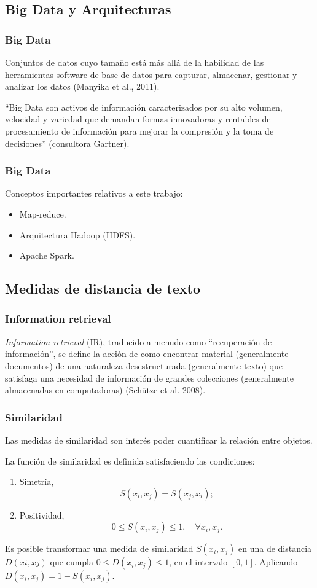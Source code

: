 \subsection{Big Data y Arquitecturas}
\begin{frame}
	\frametitle{Big Data}
	Conjuntos de datos cuyo tamaño está más allá de la habilidad de las herramientas software de base de datos para capturar, almacenar, gestionar y analizar los datos (Manyika et al., 2011).

	\bigskip

	``Big Data son activos de información caracterizados por su alto volumen, velocidad y variedad que demandan formas innovadoras y rentables de procesamiento de información para mejorar la compresión y la toma de decisiones'' (consultora Gartner).
\end{frame}

\begin{frame}
	\frametitle{Big Data}
	Conceptos importantes relativos a este trabajo:

	\begin{itemize} [<+>]
		\item Map-reduce.
		\item Arquitectura Hadoop (HDFS).
		\item Apache Spark.
	\end{itemize}
\end{frame}

\subsection{Medidas de distancia de texto}
\begin{frame}
	\frametitle{Information retrieval}
	\textit{Information retrieval} (IR), traducido a menudo como ``recuperación de información'', se define la acción de como encontrar material (generalmente documentos) de una naturaleza desestructurada (generalmente texto) que satisfaga una necesidad de información de grandes colecciones (generalmente almacenadas en computadoras) (Schütze et al. 2008).
\end{frame}

\begin{frame}
	\frametitle{Similaridad}
	Las medidas de similaridad son interés poder cuantificar la relación entre objetos.

	\bigskip

	La función de similaridad es definida satisfaciendo las condiciones:
	\begin{enumerate}
		\item Simetría,
		\[S(x_i,x_j)=S(x_j,x_i);\]

		\item Positividad,
		\[0 \leq S(x_i,x_j) \leq 1, \quad \forall x_i,x_j.\]
	\end{enumerate}

	\bigskip
	Es posible transformar una medida de similaridad \(S(x_i,x_j)\) en una de distancia \(D(xi,xj)\) que cumpla \(0 \leq D(x_i,x_j) \leq 1\), en el intervalo \([0,1]\). Aplicando \(D(x_i,x_j) = 1 - S(x_i,x_j)\).
\end{frame}

